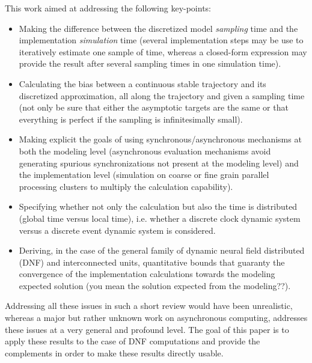 
This work aimed at addressing the following key-points: 
\begin{itemize}
\item Making the difference between the discretized model {\em sampling} time and the implementation {\em simulation} time
(several implementation steps may be use to iteratively estimate one sample of time, whereas a closed-form expression may provide the result after several sampling times in
one simulation time).
\item Calculating the bias between a continuous stable trajectory and its discretized approximation, all along the trajectory and given a sampling time 
(not only be sure that either the asymptotic targets are the same or that everything is perfect if the sampling is infinitesimally small).
\item Making explicit the goals of using synchronous/asynchronous mechanisms at both the modeling level (asynchronous evaluation mechanisms avoid generating spurious synchronizations not present at the modeling level) and the implementation level (simulation on coarse or fine grain parallel processing clusters to multiply the calculation capability). 
\item Specifying whether not only the calculation but also the time is distributed (global time versus local time), i.e. whether a discrete clock dynamic system versus a discrete event dynamic system is considered.
\item Deriving, in the case of the general family of dynamic neural field distributed (DNF) and interconnected units, quantitative bounds that guaranty the convergence of the implementation calculations towards the modeling expected solution (you mean the solution expected from the modeling??).
\end{itemize}
Addressing all these issues in such a short review would have been unrealistic, whereas a major but rather unknown work \cite{Mitra:1987} on asynchronous computing, addresses these issues at a very general and profound level. The goal of this paper is to apply these results to the case of DNF computations and provide the complements in order to make these results directly usable.
